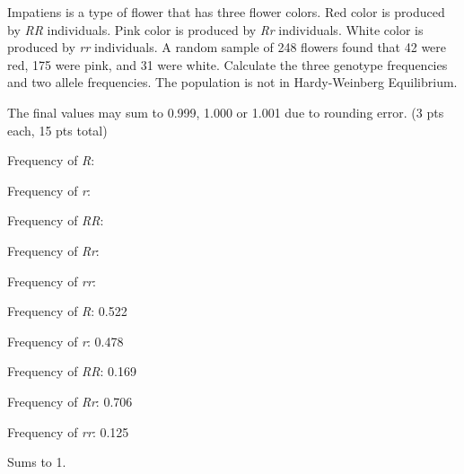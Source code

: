 
\question[15]
Impatiens is a type of flower that has three flower colors. Red color is produced by \textit{RR} individuals. Pink color is produced by \textit{Rr} individuals. White color is produced by \textit{rr} individuals. A random sample of 248 flowers found that 42 were red, 175 were pink, and 31 were white. Calculate the three genotype frequencies and two allele frequencies. The population is not in Hardy-Weinberg Equilibrium.

 The final values may sum to 0.999, 1.000 or 1.001 due to rounding error. (3 pts each, 15 pts total)

\vspace{2\baselineskip}
Frequency of \textit{R}:

\vspace{2\baselineskip}
Frequency of \textit{r}:

\vspace{2\baselineskip}
Frequency of \textit{RR}:

\vspace{2\baselineskip}
Frequency of \textit{Rr}:

\vspace{2\baselineskip}
Frequency of \textit{rr}: 

\begin{solution}

\vspace{2\baselineskip}
Frequency of \textit{R}: 0.522

\vspace{\baselineskip}
Frequency of \textit{r}: 0.478

\vspace{\baselineskip}
Frequency of \textit{RR}: 0.169

\vspace{\baselineskip}
Frequency of \textit{Rr}: 0.706

\vspace{\baselineskip}
Frequency of \textit{rr}: 0.125

\vspace{\baselineskip}
Sums to 1.
\end{solution}